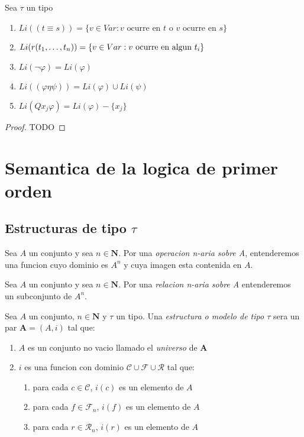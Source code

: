 \begin{lemma}
  Sea $\tau$ un tipo
  \begin{enumerate}
    \item $Li((t\equiv s)) = \{v \in Var : v \text{ ocurre en } t \text{ o } v \text{ ocurre en } s\}$
    \item $Li(r(t_{1}, \dots, t_{n})) = \{v \in Var : v \text{ ocurre en algun } t_i\}$
    \item $Li(\neg\varphi) = Li(\varphi)$
    \item $Li((\varphi\eta\psi)) = Li(\varphi) \cup Li(\psi)$
    \item $Li(Qx_j\varphi) = Li(\varphi) - \{x_j\}$
  \end{enumerate}
\end{lemma}
\begin{proof}
  TODO
\end{proof}

\section{Semantica de la logica de primer orden}

\subsection{Estructuras de tipo $\tau$}
\begin{definition}
  Sea $A$ un conjunto y sea $n \in \mathbf{N}$. Por una \emph{operacion n-aria sobre A}, entenderemos
  una funcion cuyo dominio es $A^n$ y cuya imagen esta contenida en $A$.
\end{definition}

\begin{definition}
  Sea $A$ un conjunto y sea $n \in \mathbf{N}$. Por una \emph{relacion n-aria sobre A} entenderemos un subconjunto de $A^n$.
\end{definition}

\begin{definition}
  Sea $A$ un conjunto, $n \in \mathbf{N}$ y $\tau$ un tipo. Una \emph{estructura o modelo de tipo $\tau$} sera un par $\mathbf{A} = (A, i)$ tal que:
  \begin{enumerate}
    \item $A$ es un conjunto no vacio llamado el \emph{universo} de $\mathbf{A}$
    \item $i$ es una funcion con dominio $\mathcal{C} \cup \mathcal{F} \cup \mathcal{R}$ tal que: \begin{enumerate}
      \item para cada $c \in \mathcal{C}$, $i(c)$ es un elemento de $A$
      \item para cada $f \in \mathcal{F}_n$, $i(f)$ es un elemento de $A$
      \item para cada $r \in \mathcal{R}_n$, $i(r)$ es un elemento de $A$
    \end{enumerate}
  \end{enumerate}
\end{definition}

